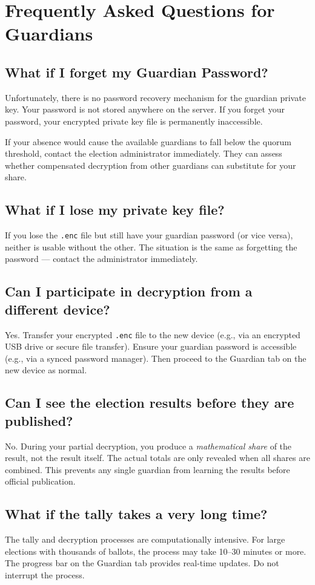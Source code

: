 \documentclass[12pt,a4paper]{book}
\begin{document}
\chapter{Frequently Asked Questions for Guardians}

\section*{What if I forget my Guardian Password?}

Unfortunately, there is no password recovery mechanism for the guardian private key. Your password is not stored anywhere on the server. If you forget your password, your encrypted private key file is permanently inaccessible.

If your absence would cause the available guardians to fall below the quorum threshold, contact the election administrator immediately. They can assess whether compensated decryption from other guardians can substitute for your share.

\section*{What if I lose my private key file?}

If you lose the \texttt{.enc} file but still have your guardian password (or vice versa), neither is usable without the other. The situation is the same as forgetting the password --- contact the administrator immediately.

\section*{Can I participate in decryption from a different device?}

Yes. Transfer your encrypted \texttt{.enc} file to the new device (e.g., via an encrypted USB drive or secure file transfer). Ensure your guardian password is accessible (e.g., via a synced password manager). Then proceed to the Guardian tab on the new device as normal.

\section*{Can I see the election results before they are published?}

No. During your partial decryption, you produce a \emph{mathematical share} of the result, not the result itself. The actual totals are only revealed when all shares are combined. This prevents any single guardian from learning the results before official publication.

\section*{What if the tally takes a very long time?}

The tally and decryption processes are computationally intensive. For large elections with thousands of ballots, the process may take 10--30 minutes or more. The progress bar on the Guardian tab provides real-time updates. Do not interrupt the process.
\end{document}
